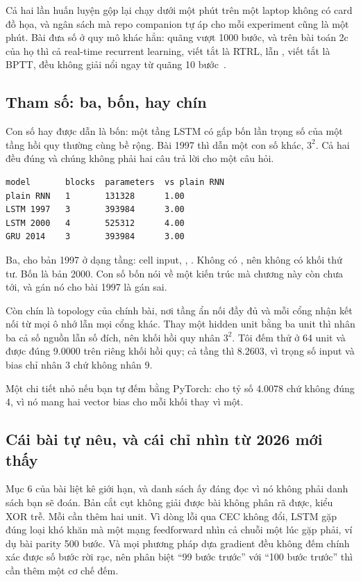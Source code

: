 Cả hai lần huấn luyện gộp lại chạy dưới một phút trên một laptop không có card
đồ họa, và ngân sách mà repo companion tự áp cho mỗi experiment cũng là một
phút. Bài đưa số ở quy mô khác hẳn: quãng vượt 1000 bước, và trên bài toán 2c
của họ thì cả real-time recurrent learning, viết tắt là RTRL, lẫn
, viết tắt là
BPTT, đều không giải nổi ngay từ quãng 10
bước~\autocite{hochreiter1997lstm}.

\subsection*{Tham số: ba, bốn, hay chín}

%
Con số hay được dẫn là bốn: một tầng LSTM có gấp bốn lần trọng số của một tầng
hồi quy thường cùng bề rộng. Bài 1997 thì dẫn một con số khác, \(3^2\). Cả hai
đều đúng và chúng không phải hai câu trả lời cho một câu hỏi.

\begin{verbatim}
model       blocks  parameters  vs plain RNN
plain RNN   1       131328      1.00
LSTM 1997   3       393984      3.00
LSTM 2000   4       525312      4.00
GRU 2014    3       393984      3.00
\end{verbatim}

Ba, cho bản 1997 ở dạng tầng: cell input, ,
. Không có , nên không có
khối thứ tư. Bốn là bản 2000. Con số bốn nói về một kiến trúc mà chương này còn
chưa tới, và gán nó cho bài 1997 là gán sai.

Còn chín là topology của chính bài, nơi tầng ẩn nối đầy đủ và mỗi cổng nhận kết
nối từ mọi ô nhớ lẫn mọi cổng khác. Thay một hidden unit bằng ba unit thì nhân
ba cả số nguồn lẫn số đích, nên khối hồi quy nhân \(3^2\). Tôi đếm thử ở 64
unit và được đúng 9.0000 trên riêng khối hồi quy; cả tầng thì 8.2603, vì trọng
số input và bias chỉ nhân 3 chứ không nhân 9.

Một chi tiết nhỏ nếu bạn tự đếm bằng PyTorch:  cho tỷ số
4.0078 chứ không đúng 4, vì nó mang hai vector bias cho mỗi khối thay vì một.

\subsection*{Cái bài tự nêu, và cái chỉ nhìn từ 2026 mới thấy}

%
Mục 6 của bài liệt kê giới hạn, và danh sách ấy đáng đọc vì nó không phải danh
sách bạn sẽ đoán. Bản cắt cụt không giải được bài không phân rã được, kiểu XOR
trễ. Mỗi  cần thêm hai unit. Vì dòng lỗi qua
CEC không đổi, LSTM gặp đúng loại khó khăn mà một mạng feedforward nhìn cả
chuỗi một lúc gặp phải, ví dụ bài parity 500 bước. Và mọi phương pháp dựa
gradient đều không đếm chính xác được số bước rời rạc, nên phân biệt
\enquote{99 bước trước} với \enquote{100 bước trước} thì cần thêm một cơ chế
đếm.

